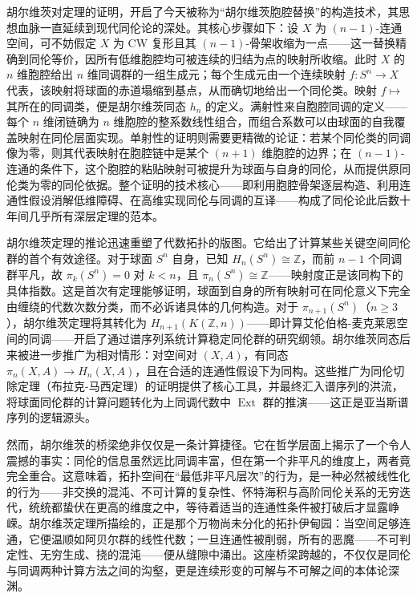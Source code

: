 \documentclass[12pt,a4paper]{article}
\begin{document}
胡尔维茨对定理的证明，开启了今天被称为“胡尔维茨胞腔替换”的构造技术，其思想血脉一直延续到现代同伦论的深处。其核心步骤如下：设 $X$ 为 $(n-1)$-连通空间，可不妨假定 $X$ 为 CW 复形且其 $(n-1)$-骨架收缩为一点——这一替换精确到同伦等价，因所有低维胞腔均可被连续的归结为点的映射所收缩。此时 $X$ 的 $n$ 维胞腔给出 $n$ 维同调群的一组生成元；每个生成元由一个连续映射 $f: S^n \to X$ 代表，该映射将球面的赤道塌缩到基点，从而确切地给出一个同伦类。映射 $f \mapsto$ 其所在的同调类，便是胡尔维茨同态 $h_n$ 的定义。满射性来自胞腔同调的定义——每个 $n$ 维闭链确为 $n$ 维胞腔的整系数线性组合，而组合系数可以由球面的自我覆盖映射在同伦层面实现。单射性的证明则需要更精微的论证：若某个同伦类的同调像为零，则其代表映射在胞腔链中是某个 $(n+1)$ 维胞腔的边界；在 $(n-1)$-连通的条件下，这个胞腔的粘贴映射可被提升为球面与自身的同伦，从而提供原同伦类为零的同伦依据。整个证明的技术核心——即利用胞腔骨架逐层构造、利用连通性假设消解低维障碍、在高维实现同伦与同调的互译——构成了同伦论此后数十年间几乎所有深层定理的范本。

胡尔维茨定理的推论迅速重塑了代数拓扑的版图。它给出了计算某些关键空间同伦群的首个有效途径。对于球面 $S^n$ 自身，已知 $H_n(S^n) \cong \mathbb{Z}$，而前 $n-1$ 个同调群平凡，故 $\pi_k(S^n)=0$ 对 $k < n$，且 $\pi_n(S^n) \cong \mathbb{Z}$——映射度正是该同构下的具体指数。这是首次有定理能够证明，球面到自身的所有映射可在同伦意义下完全由缠绕的代数次数分类，而不必诉诸具体的几何构造。对于 $\pi_{n+1}(S^n)$（$n \geq 3$），胡尔维茨定理将其转化为 $H_{n+1}(K(\mathbb{Z}, n))$——即计算艾伦伯格-麦克莱恩空间的同调——开启了通过谱序列系统计算稳定同伦群的研究纲领。胡尔维茨同态后来被进一步推广为相对情形：对空间对 $(X,A)$，有同态 $\pi_n(X,A) \to H_n(X,A)$，且在合适的连通性假设下为同构。这些推广为同伦切除定理（布拉克-马西定理）的证明提供了核心工具，并最终汇入谱序列的洪流，将球面同伦群的计算问题转化为上同调代数中 $\operatorname{Ext}$ 群的推演——这正是亚当斯谱序列的逻辑源头。

然而，胡尔维茨的桥梁绝非仅仅是一条计算捷径。它在哲学层面上揭示了一个令人震撼的事实：同伦的信息虽然远比同调丰富，但在第一个非平凡的维度上，两者竟完全重合。这意味着，拓扑空间在“最低非平凡层次”的行为，是一种必然被线性化的行为——非交换的混沌、不可计算的复杂性、怀特海积与高阶同伦关系的无穷迭代，统统都蛰伏在更高的维度之中，等待着适当的连通性条件被打破后才显露峥嵘。胡尔维茨定理所描绘的，正是那个万物尚未分化的拓扑伊甸园：当空间足够连通，它便温顺如阿贝尔群的线性代数；一旦连通性被削弱，所有的恶魔——不可判定性、无穷生成、挠的混沌——便从缝隙中涌出。这座桥梁跨越的，不仅仅是同伦与同调两种计算方法之间的沟壑，更是连续形变的可解与不可解之间的本体论深渊。
\end{document}
